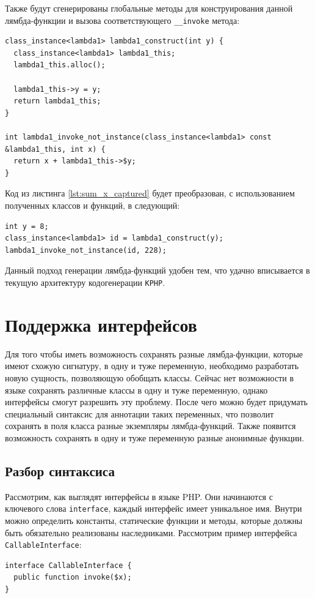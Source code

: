 Также будут сгенерированы глобальные методы для конструирования данной лямбда-функции и вызова соответствующего \verb|__invoke| метода:
\begin{lstlisting}
class_instance<lambda1> lambda1_construct(int y) {
  class_instance<lambda1> lambda1_this;
  lambda1_this.alloc();

  lambda1_this->y = y;
  return lambda1_this;
}

int lambda1_invoke_not_instance(class_instance<lambda1> const &lambda1_this, int x) {
  return x + lambda1_this->$y;
}
\end{lstlisting}

Код из листинга \ref{lst:sum_x_captured} будет преобразован, с использованием полученных классов и функций, в следующий:
\begin{lstlisting}
int y = 8;
class_instance<lambda1> id = lambda1_construct(y);
lambda1_invoke_not_instance(id, 228);
\end{lstlisting}

Данный подход генерации лямбда-функций удобен тем, что удачно вписывается в текущую архитектуру кодогенерации \verb|KPHP|.

\section{Поддержка интерфейсов}
Для того чтобы иметь возможность сохранять разные лямбда-функции, которые имеют схожую сигнатуру, в одну и туже переменную, необходимо разработать новую сущность, позволяющую обобщать классы.
Сейчас нет возможности в языке сохранять различные классы в одну и туже переменную, однако интерфейсы смогут разрешить эту проблему.
После чего можно будет придумать специальный синтаксис для аннотации таких переменных, что позволит сохранять в поля класса разные экземпляры лямбда-функций.
Также появится возможность сохранять в одну и туже переменную разные анонимные функции.

\subsection{Разбор синтаксиса}
Рассмотрим, как выглядят интерфейсы в языке PHP.
Они начинаются с ключевого слова \verb|interface|, каждый интерфейс имеет уникальное имя.
Внутри можно определить константы, статические функции и методы, которые должны быть обязательно реализованы наследниками.
Рассмотрим пример интерфейса \verb|CallableInterface|:
\begin{lstlisting}[caption={Пример интерфейса Callable},label={lst:callable-interface-example}]
interface CallableInterface {
  public function invoke($x);
}
\end{lstlisting}

